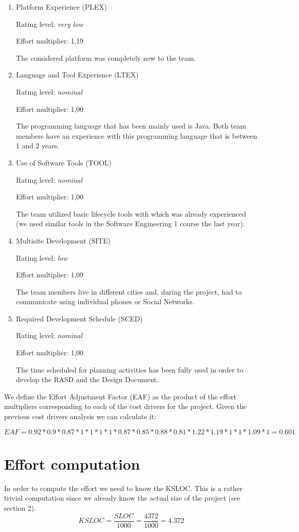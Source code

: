 \documentclass[10pt,a4paper,titlepage]{article}
\begin{document}
\begin{enumerate}
\item Platform Experience (PLEX) 

Rating level: \textit{very low}

Effort multiplier: 1,19 
 
The considered platform was completely new to the team. 

\item Language and Tool Experience (LTEX) 

Rating level: \textit{nominal}

Effort multiplier: 1,00 
 
The programming language that has been mainly used is Java. Both team members have an experience with this programming language that is between 1 and 2 years. 
 
\item Use of Software Tools (TOOL) 

Rating level: \textit{nominal}

Effort multiplier: 1,00 
 
The team utilized basic lifecycle tools with which was already experienced (we used similar tools in the Software Engineering 1 course the last year). 

\item Multisite Development (SITE) 

Rating level: \textit{low}

Effort multiplier: 1,09 
 
The team members live in different cities and, during the project, had to communicate using individual phones or Social Networks. 
 
\item Required Development Schedule (SCED) 

Rating level: \textit{nominal}

Effort multiplier: 1,00 
 
The time scheduled for planning activities has been fully used in order to develop the RASD and the Design Document.
\end{enumerate}

We define the Effort Adjustment Factor (EAF) as the product of the effort multipliers corresponding to each of the cost drivers for the project. Given the previous cost drivers analysis we can calculate it:

\[EAF= 0.92 * 0.9 * 0.87 * 1 * 1 * 1 * 1 * 0.87 * 0.85 * 0.88 * 0.81 * 1.22 * 1.19 * 1 * 1 * 1.09 * 1 = 0.601\]
 
\section{Effort computation}
 In order to compute the effort we need to know the KSLOC. This is a rather trivial computation since we already know the actual size of the project (see section 2). 
\[KSLOC = \frac{SLOC}{1000} = \frac{4372}{1000} = 4.372\]
 
\end{document}
